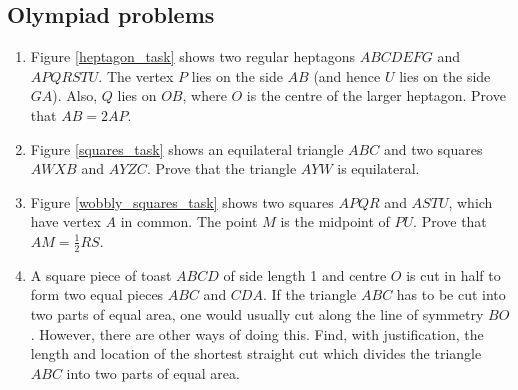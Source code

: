 \documentclass{article}
\begin{document}
  \subsection{Olympiad problems}
  \begin{enumerate}
    \item \label{heptagon_task_statement} Figure \ref{heptagon_task} shows two regular heptagons $ABCDEFG$ and $APQRSTU$. The vertex $P$ lies on the side $AB$ (and hence $U$ lies on the side $GA$). Also, $Q$ lies on $OB$, where $O$ is the centre of the larger heptagon. Prove that $AB = 2AP$.
    \item \label{squares_task_statement} Figure \ref{squares_task} shows an equilateral triangle $ABC$ and two squares $AWXB$ and $AYZC$. Prove that the triangle $AYW$ is equilateral.
    \item \label{wobbly_squares_task_statement} Figure \ref{wobbly_squares_task} shows two squares $APQR$ and $ASTU$, which have vertex $A$ in common. The point $M$ is the midpoint of $PU$. Prove that $AM = \frac{1}{2}RS$.

    \item A square piece of toast $ABCD$ of side length 1 and centre $O$ is cut in half to form two equal pieces $ABC$ and $CDA$. If the triangle $ABC$ has to be cut into two parts of equal area, one would usually cut along the line of symmetry $BO$. However, there are other ways of doing this. Find, with justification, the length and location of the shortest straight cut which divides the triangle $ABC$ into two parts of equal area.


\end{enumerate}
\end{document}

